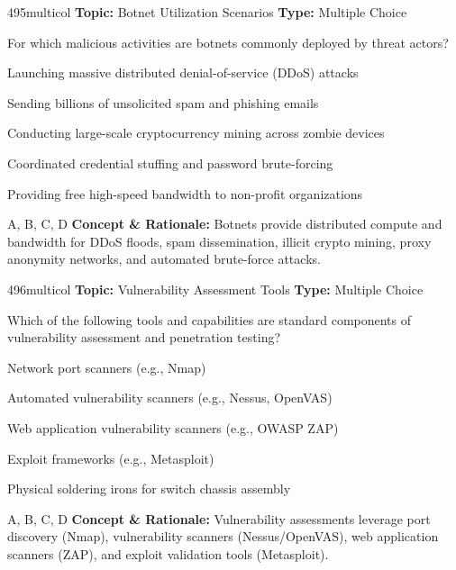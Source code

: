 \begin{qcard}{495}{multicol}
\textcolor{darkslate!75}{\small\textbf{Topic:} Botnet Utilization Scenarios \hfill \textbf{Type:} Multiple Choice}\vspace{0.4em}\par
For which malicious activities are botnets commonly deployed by threat actors?
\begin{qoptions}
\item Launching massive distributed denial-of-service (DDoS) attacks
\item Sending billions of unsolicited spam and phishing emails
\item Conducting large-scale cryptocurrency mining across zombie devices
\item Coordinated credential stuffing and password brute-forcing
\item Providing free high-speed bandwidth to non-profit organizations
\end{qoptions}
\end{qcard}
\nopagebreak
\begin{explainbox}{A, B, C, D}
\textbf{Concept \& Rationale:} Botnets provide distributed compute and bandwidth for DDoS floods, spam dissemination, illicit crypto mining, proxy anonymity networks, and automated brute-force attacks.
\end{explainbox}

\begin{qcard}{496}{multicol}
\textcolor{darkslate!75}{\small\textbf{Topic:} Vulnerability Assessment Tools \hfill \textbf{Type:} Multiple Choice}\vspace{0.4em}\par
Which of the following tools and capabilities are standard components of vulnerability assessment and penetration testing?
\begin{qoptions}
\item Network port scanners (e.g., Nmap)
\item Automated vulnerability scanners (e.g., Nessus, OpenVAS)
\item Web application vulnerability scanners (e.g., OWASP ZAP)
\item Exploit frameworks (e.g., Metasploit)
\item Physical soldering irons for switch chassis assembly
\end{qoptions}
\end{qcard}
\nopagebreak
\begin{explainbox}{A, B, C, D}
\textbf{Concept \& Rationale:} Vulnerability assessments leverage port discovery (Nmap), vulnerability scanners (Nessus/OpenVAS), web application scanners (ZAP), and exploit validation tools (Metasploit).
\end{explainbox}

